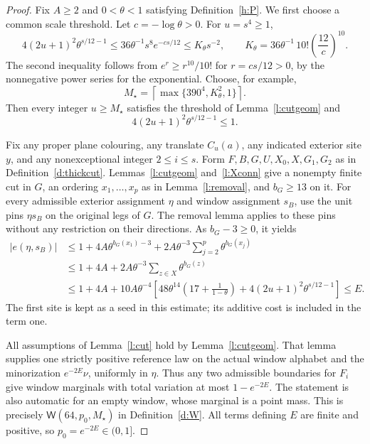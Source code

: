 \begin{proof}
Fix \(A\ge2\) and \(0<\theta<1\) satisfying
Definition~\ref{h:P}.  We first choose a common scale threshold.
Let \(c=-\log\theta>0\).  For \(u=s^4\ge1\),
\[
 4(2u+1)^2\theta^{s/12-1}
       \le36\theta^{-1}s^8 e^{-cs/12}
       \le K_\theta s^{-2},\qquad
 K_\theta=36\theta^{-1}\,10!\left(\frac{12}{c}\right)^{10}.
\]
The second inequality follows from
\(e^r\ge r^{10}/10!\) for \(r=cs/12>0\), by the
nonnegative power series for the exponential.
Choose, for example,
\[
 M_\star=\left\lceil\max\{390^4,K_\theta^2,1\}\right\rceil.
\]
Then every integer \(u\ge M_\star\) satisfies the threshold
of Lemma~\ref{l:cutgeom} and
\begin{equation}\label{e:windowtail}
                 4(2u+1)^2\theta^{s/12-1}\le1.
\end{equation}

Fix any proper plane colouring, any translate \(C_u(a)\),
any indicated exterior site \(y\), and any nonexceptional
integer \(2\le i\le s\).  Form \(F,B,G,U,X_0,X,G_1,G_2\)
as in Definition~\ref{d:thickcut}.  Lemmas~\ref{l:cutgeom}
and~\ref{l:Xconn} give a nonempty finite cut in \(G\), an
ordering \(x_1,\ldots,x_p\) as in Lemma~\ref{l:removal},
and \(b_G\ge13\) on it.  For every admissible exterior
assignment \(\eta\) and window assignment \(s_B\), use the
unit pins \(\eta s_B\) on the original legs of \(G\).
The removal lemma applies to these pins without any restriction
on their directions.  As \(b_G-3\ge0\), it yields
\begin{equation}\label{e:windowcutcost}
 \begin{split}
 |e(\eta,s_B)|
 &\le1+4A\theta^{b_G(x_1)-3}
                    +2A\theta^{-3}\sum_{j=2}^p\theta^{b_G(x_j)}\\
 &\le1+4A+2A\theta^{-3}\sum_{z\in X}\theta^{b_G(z)}\\
 &\le1+4A+10A\theta^{-4}
       \left[48\theta^{14}\left(17+\frac1{1-\theta}\right)
                        +4(2u+1)^2\theta^{s/12-1}\right]
 \le E.
 \end{split}
\end{equation}
The first site is kept as a seed in this estimate; its additive
cost is included in the term one.

All assumptions of Lemma~\ref{l:cut} hold by
Lemma~\ref{l:cutgeom}.  That lemma supplies one strictly
positive reference law on the actual window alphabet and the
minorization \(e^{-2E}\nu\), uniformly in \(\eta\).
Thus any two admissible boundaries for \(F_i\) give window
marginals with total variation at most \(1-e^{-2E}\).
The statement is also automatic for an empty window, whose
marginal is a point mass.  This is precisely
\(\mathsf W(64,p_0,M_\star)\) in Definition~\ref{d:W}.
All terms defining \(E\) are finite and positive, so
\(p_0=e^{-2E}\in(0,1]\).


\end{proof}

